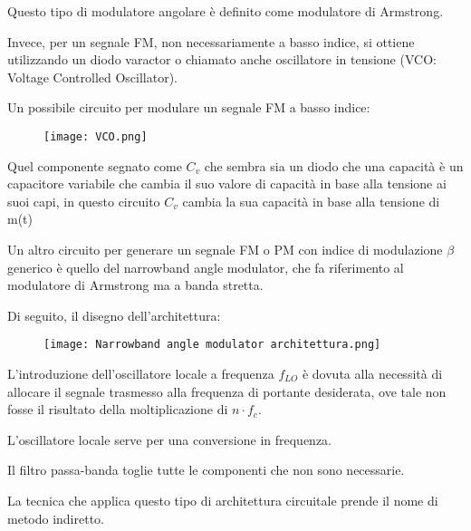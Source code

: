 Questo tipo di modulatore angolare è definito come modulatore di Armstrong. \newline 

Invece, per un segnale FM, non necessariamente a basso indice, si ottiene utilizzando un diodo varactor o chiamato anche oscillatore in tensione (VCO: Voltage Controlled Oscillator). \newline 

Un possibile circuito per modulare un segnale FM a basso indice: 

\begin{figure}[h]
    \centering
    \texttt{[image: VCO.png]}
\end{figure}

\begin{tcolorbox}
Quel componente segnato come $C_v$ che sembra sia un diodo che una capacità è un capacitore variabile che cambia il suo valore di capacità in base alla tensione ai suoi capi, 
in questo circuito $C_v$ cambia la sua capacità in base alla tensione di m(t) 
\end{tcolorbox}

Un altro circuito per generare un segnale FM o PM con indice di modulazione $\beta$ generico 
è quello del narrowband angle modulator, che fa riferimento al modulatore di Armstrong ma a banda stretta. \newline 

\newpage 

Di seguito, il disegno dell'architettura: 

\begin{figure}[h]
    \centering
    \texttt{[image: Narrowband angle modulator architettura.png]}
\end{figure}

L'introduzione dell'oscillatore locale a frequenza $f_{LO}$ è dovuta alla necessità di allocare il segnale trasmesso alla frequenza di portante desiderata, 
ove tale non fosse il risultato della moltiplicazione di $n \cdot f_c$. \newline 

L'oscillatore locale serve per una conversione in frequenza. \newline 

Il filtro passa-banda toglie tutte le componenti che non sono necessarie. \newline 

La tecnica che applica questo tipo di architettura circuitale prende il nome di metodo indiretto. \newline 


